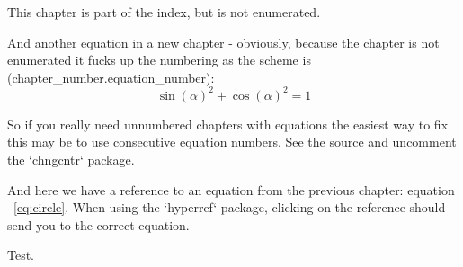 This chapter is part of the index, but is not enumerated.

And another equation in a new chapter - obviously, because the chapter is not enumerated it fucks up the numbering as the scheme is (chapter\_number.equation\_number):
\begin{equation}
    \label{eq:trig}
    \sin (\alpha)^2 + \cos (\alpha)^2 = 1
\end{equation}

So if you really need unnumbered chapters with equations the easiest way to fix this may be to use consecutive equation numbers.
See the source and uncomment the `chngcntr` package.

And here we have a reference to an equation from the previous chapter: equation ~\vref{eq:circle}.
When using the `hyperref` package, clicking on the reference should send you to the correct equation.

Test. 
